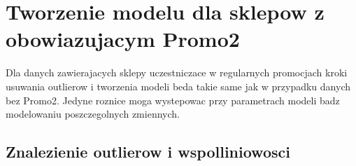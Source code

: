 \documentclass[]{article}
\newenvironment{Shaded}{\begin{snugshade}}{\end{snugshade}}
\newcommand{\DataTypeTok}[1]{\textcolor[rgb]{0.13,0.29,0.53}{#1}}
\newcommand{\KeywordTok}[1]{\textcolor[rgb]{0.13,0.29,0.53}{\textbf{#1}}}
\newcommand{\NormalTok}[1]{#1}
\newcommand{\OperatorTok}[1]{\textcolor[rgb]{0.81,0.36,0.00}{\textbf{#1}}}
\newcommand{\StringTok}[1]{\textcolor[rgb]{0.31,0.60,0.02}{#1}}
\begin{document}
\hypertarget{tworzenie-modelu-dla-sklepow-z-obowiazujacym-promo2}{%
\section{Tworzenie modelu dla sklepow z obowiazujacym
Promo2}\label{tworzenie-modelu-dla-sklepow-z-obowiazujacym-promo2}}

Dla danych zawierajacych sklepy uczestniczace w regularnych promocjach
kroki usuwania outlierow i tworzenia modeli beda takie same jak w
przypadku danych bez Promo2. Jedyne roznice moga wystepowac przy
parametrach modeli badz modelowaniu poszczegolnych zmiennych.

\hypertarget{znalezienie-outlierow-i-wspolliniowosci}{%
\subsection{Znalezienie outlierow i
wspolliniowosci}\label{znalezienie-outlierow-i-wspolliniowosci}}

\begin{Shaded}
\end{Shaded}

\begin{Shaded}
\end{Shaded}
\end{document}
